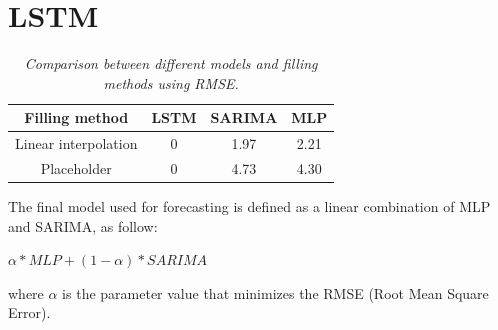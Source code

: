 \section{LSTM}

\begin{table}
 \begin{tabular}{|c|c|c|c|} 
 \hline
 Filling method & LSTM & SARIMA & MLP \\
 \hline \hline
 Linear interpolation & 0 & 1.97 & 2.21 \\
 Placeholder & 0 & 4.73 & 4.30  \\
 \hline
 \end{tabular}
 \caption{\textit{Comparison between different models and filling methods using RMSE.}}
 \label{table:RMSE}
\end{table}



The final model used for forecasting is defined as a linear combination of MLP and SARIMA, as follow:
\\
\begin{center}
  $\alpha * MLP + (1 - \alpha) * SARIMA$
\end{center}
where $\alpha$ is the parameter value that minimizes the RMSE (Root Mean Square Error).


